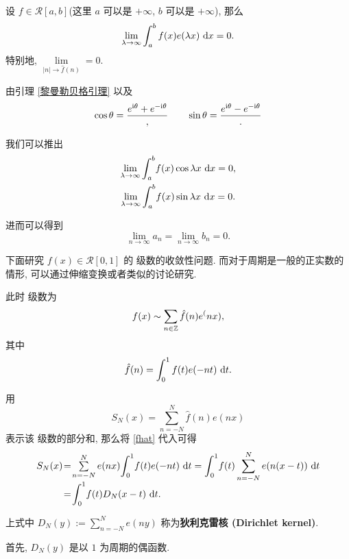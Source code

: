 \begin{lemma}[黎曼-勒贝格引理]\label{黎曼勒贝格引理}
	设 $f\in\mathscr R[a,b]$(这里 $a$ 可以是 $+\infty$, $b$ 可以是 $+\infty$), 那么 $$\lim\limits_{\lambda\to\infty}\int_a^b f(x)e(\lambda x)\td x=0.$$ 特别地, $\lim\limits_{|n|\to\hat{f}(n)}=0$.
\end{lemma}

\begin{remark}
	由引理 \ref{黎曼勒贝格引理} 以及 $$\cos\theta = \frac{e^{\ti \theta}+e^{-\ti\theta}},\qquad \sin\theta=\frac{e^{\ti\theta}-e^{-\ti\theta}}.$$

	我们可以推出 $$\begin{array}{c}
		\lim\limits_{\lambda\to\infty}\mint[a]^b f(x)\cos\lambda x\td x=0,\\[10pt]
		\lim\limits_{\lambda\to\infty}\mint[a]^b f(x)\sin\lambda x\td x=0.
	\end{array}$$

	进而可以得到 $$\lim\limits_{n\to\infty}a_n=\lim\limits_{n\to\infty}b_n=0.$$
\end{remark}


下面研究 $f(x)\in\mathscr R[0,1]$ 的 \fly 级数的收敛性问题. 而对于周期是一般的正实数的情形, 可以通过伸缩变换或者类似的讨论研究.

此时 \fly 级数为 $$f(x)\sim\sum\limits_{n\in\Z}\hat f (n)e^(nx),$$ 其中 \begin{equation}\label{fhat}
	\hat f (n)=\int_0^1 f(t)e(-nt)\td t.
\end{equation}

用 $$S_N(x)=\sum\limits_{n=-N}^N \hat f(n)e(nx)$$ 表示该 \fly 级数的部分和, 那么将 \eqref{fhat} 代入可得 \begin{equation}\label{fly部分和}
	\setlength{\arraycolsep}{0.5pt}
	\begin{array}{rcl}
		S_N(x)&=&\sum\limits_{n=-N}^Ne(nx)\mint[0]^1 f(t)e(-nt)\td t=\mint[0]^1f(t)\sum\limits_{n=-N}^Ne(n(x-t))\td t\\[10pt]
		&=&\mint[0]^1f(t)D_N(x-t)\td t.

	\end{array}
\end{equation}

\begin{definition}[狄利克雷核]\label{狄利克雷核}
	上式中 $D_N(y):=\sum\limits_{n=-N}^Ne(ny)$ 称为\textbf{狄利克雷核 (Dirichlet kernel)}.
\end{definition}

首先, $D_N(y)$ 是以 $1$ 为周期的偶函数.

